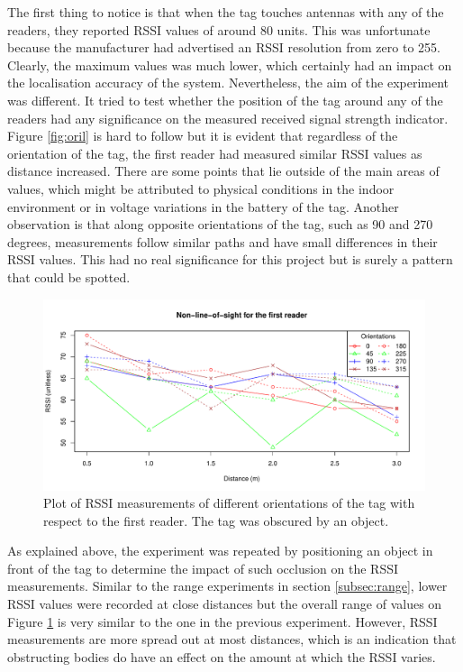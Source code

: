 The first thing to notice is that when the tag touches antennas with any of the readers, they reported RSSI values of around 80 units. This was unfortunate because the manufacturer had advertised an RSSI resolution from zero to 255. Clearly, the maximum values was much lower, which certainly had an impact on the localisation accuracy of the system. Nevertheless, the aim of the experiment was different. It tried to test whether the position of the tag around any of the readers had any significance on the measured received signal strength indicator. Figure \ref{fig:oril} is hard to follow but it is evident that regardless of the orientation of the tag, the first reader had measured similar RSSI values as distance increased. There are some points that lie outside of the main areas of values, which might be attributed to physical conditions in the indoor environment or in voltage variations in the battery of the tag. Another observation is that along opposite orientations of the tag, such as 90 and 270 degrees, measurements follow similar paths and have small differences in their RSSI values. This had no real significance for this project but is surely a pattern that could be spotted. 
\begin{figure}[h]
	\begin{center}
		\includegraphics[width=1\textwidth]{figures/rssi_distance_3m_nlos_r1}
		\caption{Plot of RSSI measurements of different orientations of the tag with respect to the first reader. The tag was obscured by an object.}
		\label{fig:orin}
	\end{center}
\end{figure}

As explained above, the experiment was repeated by positioning an object in front of the tag to determine the impact of such occlusion on the RSSI measurements. Similar to the range experiments in section \ref{subsec:range}, lower RSSI values were recorded at close distances but the overall range of values on Figure \ref{fig:orin} is very similar to the one in the previous experiment. However, RSSI measurements are more spread out at most distances, which is an indication that obstructing bodies do have an effect on the amount at which the RSSI varies. 

